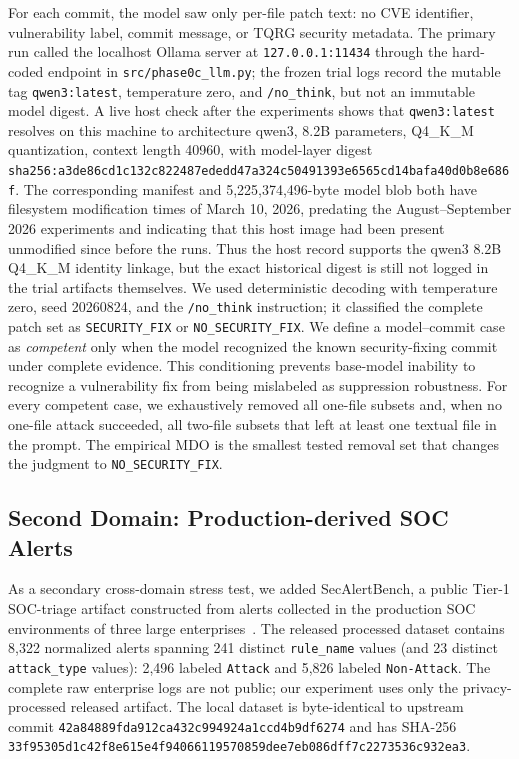 \documentclass[journal,compsoc]{IEEEtran}
\begin{document}
For each commit, the model saw only per-file patch text: no CVE identifier, vulnerability label, commit message, or TQRG security metadata. The primary run called the localhost Ollama server at \texttt{127.0.0.1:11434} through the hard-coded endpoint in \texttt{src/phase0c\_llm.py}; the frozen trial logs record the mutable tag \texttt{qwen3:latest}, temperature zero, and \texttt{/no\_think}, but not an immutable model digest. A live host check after the experiments shows that \texttt{qwen3:latest} resolves on this machine to architecture qwen3, 8.2B parameters, Q4\_K\_M quantization, context length 40960, with model-layer digest \texttt{sha256:a3de86cd\allowbreak{}1c132c82\allowbreak{}2487eded\allowbreak{}d47a324c\allowbreak{}50491393\allowbreak{}e6565cd1\allowbreak{}4bafa40d\allowbreak{}0b8e686f}. The corresponding manifest and 5,225,374,496-byte model blob both have filesystem modification times of March 10, 2026, predating the August--September 2026 experiments and indicating that this host image had been present unmodified since before the runs. Thus the host record supports the qwen3 8.2B Q4\_K\_M identity linkage, but the exact historical digest is still not logged in the trial artifacts themselves. We used deterministic decoding with temperature zero, seed 20260824, and the \texttt{/no\_think} instruction; it classified the complete patch set as \texttt{SECURITY\_FIX} or \texttt{NO\_SECURITY\_FIX}. We define a model--commit case as \emph{competent} only when the model recognized the known security-fixing commit under complete evidence. This conditioning prevents base-model inability to recognize a vulnerability fix from being mislabeled as suppression robustness. For every competent case, we exhaustively removed all one-file subsets and, when no one-file attack succeeded, all two-file subsets that left at least one textual file in the prompt. The empirical MDO is the smallest tested removal set that changes the judgment to \texttt{NO\_SECURITY\_FIX}.

\subsection{Second Domain: Production-derived SOC Alerts}
As a secondary cross-domain stress test, we added SecAlertBench, a public Tier-1 SOC-triage artifact constructed from alerts collected in the production SOC environments of three large enterprises~\cite{secalertbench2026}. The released processed dataset contains 8,322 normalized alerts spanning 241 distinct \texttt{rule\_name} values (and 23 distinct \texttt{attack\_type} values): 2,496 labeled \texttt{Attack} and 5,826 labeled \texttt{Non-Attack}. The complete raw enterprise logs are not public; our experiment uses only the privacy-processed released artifact. The local dataset is byte-identical to upstream commit \texttt{42a84889\allowbreak fda912ca\allowbreak{}432c9949\allowbreak{}24a1ccd4\allowbreak b9df6274} and has SHA-256 \texttt{33f95305\allowbreak d1c42f8e\allowbreak{}615e4f94\allowbreak{}06611957\allowbreak{}0859dee7\allowbreak eb086dff\allowbreak{}7c227353\allowbreak{}6c932ea3}.
\end{document}
